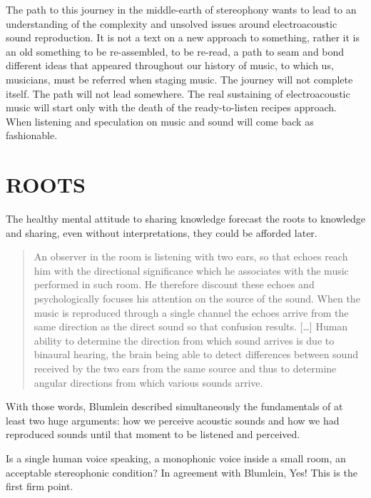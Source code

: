 \documentclass{article}
\begin{document}
The path to this journey in the middle-earth of stereophony wants to lead to an understanding of the complexity and unsolved issues around electroacoustic sound reproduction. It is not a text on a new approach to something, rather it is an old something to be re-assembled, to be re-read, a path to seam and bond different ideas that appeared throughout our history of music, to which us, musicians, must be referred when staging music. The journey will not complete itself. The path will not lead somewhere. The real sustaining of electroacoustic music will start only with the death of the ready-to-listen recipes approach. When listening and speculation on music and sound will come back as fashionable. 

\vfill\null

\newpage

\section{ROOTS}
\label{sec:roots}

The healthy mental attitude to sharing knowledge forecast the roots to knowledge and sharing, even without interpretations, they could be afforded later.

\begin{quotation}
An observer in the room is listening with two ears, so that echoes reach him
with the directional significance which he associates with the music performed
in such room. He therefore discount these echoes and psychologically focuses
his attention on the source of the sound. When the music is reproduced through
a single channel the echoes arrive from the same direction as the direct sound
so that confusion results. [\ldots] Human ability to determine the direction from which sound arrives is due to binaural hearing, the brain being able to detect differences between sound received by the two ears from the same source and thus to determine angular directions from which various sounds arrive. \cite{ab58}
\end{quotation}

With those words, Blumlein \cite{ab58} described simultaneously the fundamentals of at least two huge arguments: how we perceive acoustic sounds and how we had reproduced sounds until that moment to be listened and perceived.

Is a single human voice speaking, a monophonic voice inside a small room, an acceptable stereophonic condition? In agreement with Blumlein, Yes! This is the first firm point.
\end{document}
